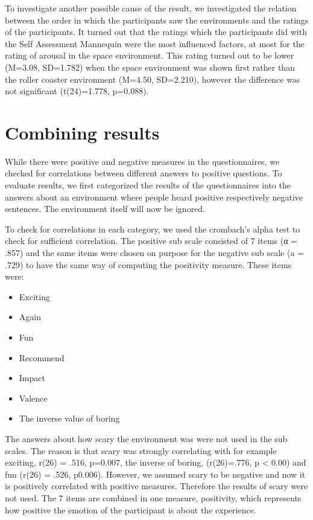 \documentclass[Results.tex]{subfiles}
\begin{document}
To investigate another possible cause of the result, we investigated the relation between the order in which the participants saw the environments and the ratings of the participants. It turned out that the ratings which the participants did with the Self Assessment Mannequin were the most influenced factors, at most for the rating of arousal in the space environment. This rating turned out to be lower (M=3.08, SD=1.782) when the space environment was shown first rather than the roller coaster environment (M=4.50, SD=2.210), however the difference was not significant (t(24)=1.778, p=0.088). 

\section{Combining results}
While there were positive and negative measures in the questionnaires, we checked for correlations between different answers to positive questions. To evaluate results, we first categorized the results of the questionnaires into the answers about an environment where people heard positive respectively negative sentences. The environment itself will now be ignored. 

To check for correlations in each category, we used the crombach's alpha test to check for sufficient correlation. The positive sub scale consisted of 7 items (α = .857) and the same items were chosen on purpose for the negative sub scale (a = .729) to have the same way of computing the positivity measure. These items were: 
\begin{itemize}
	\item Exciting
	\item Again
	\item Fun
	\item Recommend
	\item Impact
	\item Valence
	\item The inverse value of boring
\end{itemize}

The answers about how scary the environment was were not used in the sub scales. The reason is that scary was strongly correlating with for example exciting, r(26) = .516, p=0.007, the inverse of boring, (r(26)=.776, p < 0.00) and fun (r(26) = .526, p0.006). However, we assumed scary to be negative and now it is positively correlated with positive measures. Therefore the results of scary were not used. The 7 items are combined in one measure, positivity, which represents how positive the emotion of the participant is about the experience.
\end{document}

